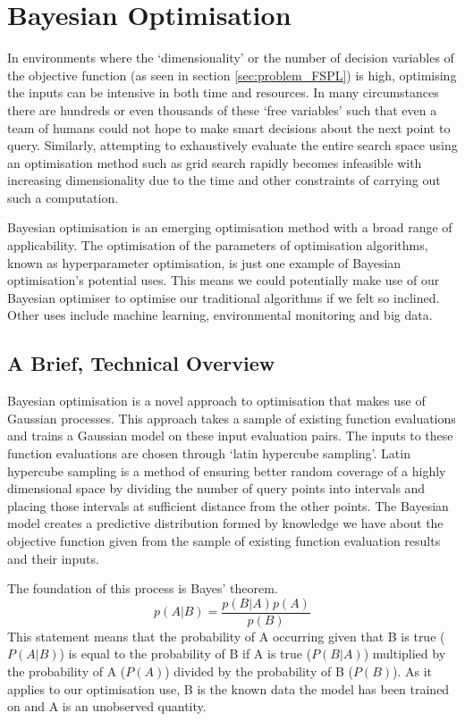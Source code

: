 \section{Bayesian Optimisation}
	\label{sec:bayesian}
	In environments where the `dimensionality' or the number of decision variables of the objective function (as seen in section \ref{sec:problem_FSPL}) is high, optimising the inputs can be intensive in both time and resources. In many circumstances there are hundreds or even thousands of these `free variables' such that even a team of humans could not hope to make smart decisions about the next point to query. Similarly, attempting to exhaustively evaluate the entire search space using an optimisation method such as grid search rapidly becomes infeasible with increasing dimensionality due to the time and other constraints of carrying out such a computation.

	Bayesian optimisation is an emerging optimisation method with a broad range of applicability. The optimisation of the parameters of optimisation algorithms, known as hyperparameter optimisation, is just one example of Bayesian optimisation's potential uses. This means we could potentially make use of our Bayesian optimiser to optimise our traditional algorithms if we felt so inclined. Other uses include machine learning, environmental monitoring and big data\cite{shahriari2015taking}.
	
	\subsection{A Brief, Technical Overview}
		\label{sec:bayesian_overview} 
		Bayesian optimisation is a novel approach to optimisation that makes use of Gaussian processes. This approach takes a sample of existing function evaluations and trains a Gaussian model on these input evaluation pairs. The inputs to these function evaluations are chosen through `latin hypercube sampling'\cite{deutsch2012lhs}. Latin hypercube sampling is a method of ensuring better random coverage of a highly dimensional space by dividing the number of query points into intervals and placing those intervals at sufficient distance from the other points. The Bayesian model creates a predictive distribution formed by knowledge we have about the objective function given from the sample of existing function evaluation results and their inputs.

		The foundation of this process is Bayes' theorem.
		\begin{equation}
			p(A | B) = \frac{p(B | A) p(A)}{p(B)}
		\end{equation}
		This statement means that the probability of A occurring given that B is true ($P(A | B)$) is equal to the probability of B if A is true ($P(B | A)$) multiplied by the probability of A ($P(A)$) divided by the probability of B ($P(B)$). As it applies to our optimisation use, B is the known data the model has been trained on and A is an unobserved quantity.
		
